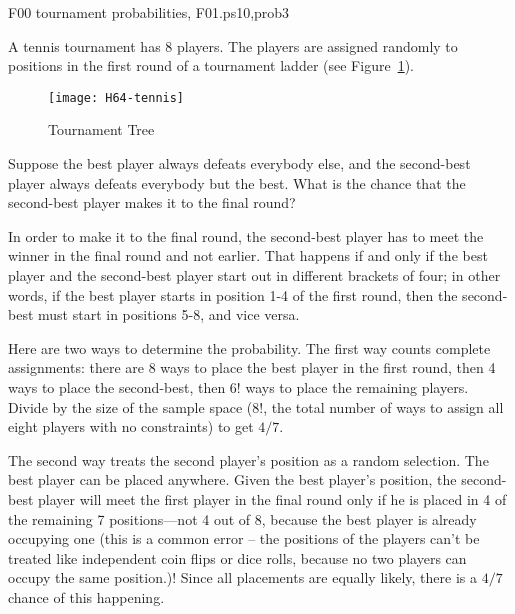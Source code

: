 \documentclass[handout]{mcs}
\begin{document}
\begin{staffnotes}
F00 tournament probabilities, F01.ps10,prob3
\end{staffnotes}

\begin{problem}
A tennis tournament has 8 players. The players are assigned randomly
to positions in the first round of a tournament ladder (see
Figure~\ref{tennis}).

\begin{figure}%
\centerline{\texttt{[image: H64-tennis]}}
\caption{Tournament Tree}
\label{tennis}
\end{figure}

\bparts

\ppart
Suppose the best player always defeats everybody else, and
the second-best player always defeats everybody but the best. What
is the chance that the second-best player makes it to the final round?

\begin{solution}
In order to make it to the final round, the
second-best player has to meet
the winner in the final round and not earlier.
That happens if and only if the best
player and the second-best player start out in different brackets of
four; in other words, if the best player starts in position 1-4 of the
first round, then the second-best must start in positions 5-8, and
vice versa.

Here are two ways to determine the probability.  The first way counts
complete assignments: there are 8 ways to place the best player in the
first round, then 4 ways to place the second-best, then $6!$ ways to
place the remaining players.  Divide by the size of the sample space
($8!$, the total number of ways to assign all eight players with no
constraints) to get $4/7$.

The second way treats the second player's position as a random selection.
The best player can be placed anywhere.  Given the best player's position,
the second-best player will meet the first player in the final round
only if he is placed in 4 of the remaining 7 positions---not 4 out of 8,
because the best player is already occupying one (this is a common error
-- the positions of the players can't be treated like independent coin
flips or dice rolls, because no two players can occupy the same
position.)!  Since all placements are equally likely, there is a $4/7$
chance of this happening.
\end{solution}


\end{problem}
\end{document}
